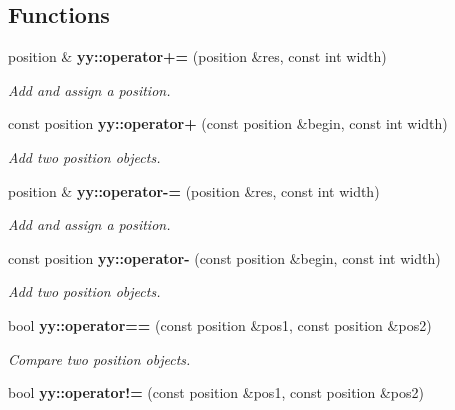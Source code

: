 \subsection*{Functions}
\begin{DoxyCompactItemize}
\item 
\hypertarget{namespaceyy_a37c3ba953a2af95dd95f0f8e4d8638b7}{position \& {\bfseries yy\-::operator+=} (position \&res, const int width)}\label{namespaceyy_a37c3ba953a2af95dd95f0f8e4d8638b7}

\begin{DoxyCompactList}\small\item\em Add and assign a position. \end{DoxyCompactList}\item 
\hypertarget{namespaceyy_a26f5ab7d06a8b08b7fb9171e90ad87d7}{const position {\bfseries yy\-::operator+} (const position \&begin, const int width)}\label{namespaceyy_a26f5ab7d06a8b08b7fb9171e90ad87d7}

\begin{DoxyCompactList}\small\item\em Add two position objects. \end{DoxyCompactList}\item 
\hypertarget{namespaceyy_a270f2ecd4dc8701bde63c3eb3a3565ea}{position \& {\bfseries yy\-::operator-\/=} (position \&res, const int width)}\label{namespaceyy_a270f2ecd4dc8701bde63c3eb3a3565ea}

\begin{DoxyCompactList}\small\item\em Add and assign a position. \end{DoxyCompactList}\item 
\hypertarget{namespaceyy_a870347901bc2465a095864610c9d04b1}{const position {\bfseries yy\-::operator-\/} (const position \&begin, const int width)}\label{namespaceyy_a870347901bc2465a095864610c9d04b1}

\begin{DoxyCompactList}\small\item\em Add two position objects. \end{DoxyCompactList}\item 
\hypertarget{namespaceyy_a30a61b0569cd2c9ea4ae16eb4994c7b3}{bool {\bfseries yy\-::operator==} (const position \&pos1, const position \&pos2)}\label{namespaceyy_a30a61b0569cd2c9ea4ae16eb4994c7b3}

\begin{DoxyCompactList}\small\item\em Compare two position objects. \end{DoxyCompactList}\item 
\hypertarget{namespaceyy_abf91f5a379cf9f8c8be94f650c48c06c}{bool {\bfseries yy\-::operator!=} (const position \&pos1, const position \&pos2)}\label{namespaceyy_abf91f5a379cf9f8c8be94f650c48c06c}


\end{DoxyCompactItemize}
